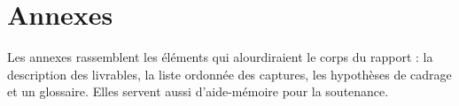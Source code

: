 \chapter*{Annexes}

Les annexes rassemblent les éléments qui alourdiraient le corps du rapport :
la description des livrables, la liste ordonnée des captures, les hypothèses de
cadrage et un glossaire. Elles servent aussi d'aide-mémoire pour la
soutenance.





